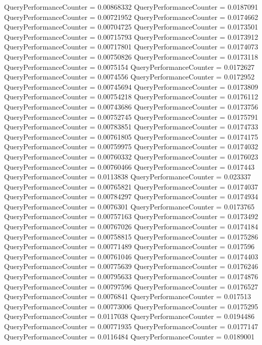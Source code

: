 \documentclass[9pt]{article}
\theoremstyle{plain}
\theoremstyle{definition}
\theoremstyle{remark}
\numberwithin{equation}{section}
\begin{document}
QueryPerformanceCounter  =  0.00868332
QueryPerformanceCounter  =  0.0187091
QueryPerformanceCounter  =  0.00721952
QueryPerformanceCounter  =  0.0174662
QueryPerformanceCounter  =  0.00704725
QueryPerformanceCounter  =  0.0173501
QueryPerformanceCounter  =  0.00715793
QueryPerformanceCounter  =  0.0173912
QueryPerformanceCounter  =  0.00717801
QueryPerformanceCounter  =  0.0174073
QueryPerformanceCounter  =  0.00750826
QueryPerformanceCounter  =  0.0173118
QueryPerformanceCounter  =  0.0075154
QueryPerformanceCounter  =  0.0172627
QueryPerformanceCounter  =  0.0074556
QueryPerformanceCounter  =  0.0172952
QueryPerformanceCounter  =  0.00745694
QueryPerformanceCounter  =  0.0173809
QueryPerformanceCounter  =  0.00754218
QueryPerformanceCounter  =  0.0176112
QueryPerformanceCounter  =  0.00743686
QueryPerformanceCounter  =  0.0173756
QueryPerformanceCounter  =  0.00752745
QueryPerformanceCounter  =  0.0175791
QueryPerformanceCounter  =  0.00783851
QueryPerformanceCounter  =  0.0174733
QueryPerformanceCounter  =  0.00761805
QueryPerformanceCounter  =  0.0174175
QueryPerformanceCounter  =  0.00759975
QueryPerformanceCounter  =  0.0174032
QueryPerformanceCounter  =  0.00760332
QueryPerformanceCounter  =  0.0176023
QueryPerformanceCounter  =  0.00760466
QueryPerformanceCounter  =  0.017443
QueryPerformanceCounter  =  0.0113838
QueryPerformanceCounter  =  0.023337
QueryPerformanceCounter  =  0.00765821
QueryPerformanceCounter  =  0.0174037
QueryPerformanceCounter  =  0.00784297
QueryPerformanceCounter  =  0.0174934
QueryPerformanceCounter  =  0.0076301
QueryPerformanceCounter  =  0.0173765
QueryPerformanceCounter  =  0.00757163
QueryPerformanceCounter  =  0.0173492
QueryPerformanceCounter  =  0.00767026
QueryPerformanceCounter  =  0.0174184
QueryPerformanceCounter  =  0.00758815
QueryPerformanceCounter  =  0.0175286
QueryPerformanceCounter  =  0.00771489
QueryPerformanceCounter  =  0.017596
QueryPerformanceCounter  =  0.00761046
QueryPerformanceCounter  =  0.0174403
QueryPerformanceCounter  =  0.00775639
QueryPerformanceCounter  =  0.0176246
QueryPerformanceCounter  =  0.00795633
QueryPerformanceCounter  =  0.0174876
QueryPerformanceCounter  =  0.00797596
QueryPerformanceCounter  =  0.0176527
QueryPerformanceCounter  =  0.0076841
QueryPerformanceCounter  =  0.017513
QueryPerformanceCounter  =  0.00773006
QueryPerformanceCounter  =  0.0175295
QueryPerformanceCounter  =  0.0117038
QueryPerformanceCounter  =  0.0194486
QueryPerformanceCounter  =  0.00771935
QueryPerformanceCounter  =  0.0177147
QueryPerformanceCounter  =  0.0116484
QueryPerformanceCounter  =  0.0189001
\end{document}
